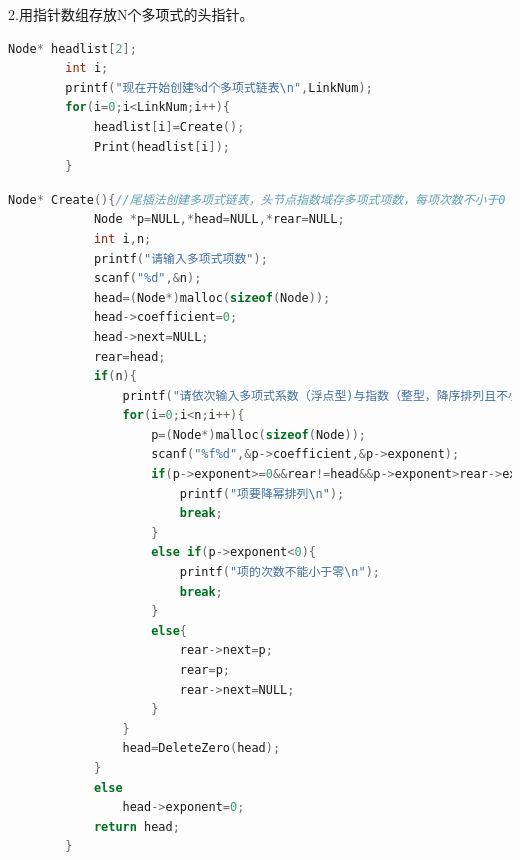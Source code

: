 \documentclass{ctexart}
\begin{document}
	2.用指针数组存放N个多项式的头指针。
	\begin{lstlisting}[language=C, caption=头指针数组]
		Node* headlist[2];
		int i;
		printf("现在开始创建%d个多项式链表\n",LinkNum);
		for(i=0;i<LinkNum;i++){
			headlist[i]=Create();
			Print(headlist[i]);
		}
	\end{lstlisting}
	\begin{lstlisting}[language=C, caption=创建多项式链表结构过程]
		Node* Create(){//尾插法创建多项式链表，头节点指数域存多项式项数，每项次数不小于0
			Node *p=NULL,*head=NULL,*rear=NULL;
			int i,n;
			printf("请输入多项式项数");
			scanf("%d",&n);
			head=(Node*)malloc(sizeof(Node));
			head->coefficient=0;
			head->next=NULL;
			rear=head;
			if(n){
				printf("请依次输入多项式系数（浮点型)与指数（整型，降序排列且不小于0）");
				for(i=0;i<n;i++){
					p=(Node*)malloc(sizeof(Node));
					scanf("%f%d",&p->coefficient,&p->exponent);
					if(p->exponent>=0&&rear!=head&&p->exponent>rear->exponent){
						printf("项要降幂排列\n");
						break;
					}
					else if(p->exponent<0){
						printf("项的次数不能小于零\n");
						break;
					}
					else{
						rear->next=p;
						rear=p;
						rear->next=NULL;
					}
				}
				head=DeleteZero(head);
			}
			else
				head->exponent=0;
			return head;
		}
	\end{lstlisting}
\end{document}
